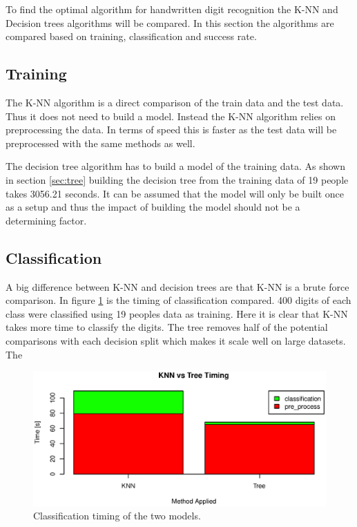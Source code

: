 To find the optimal algorithm for handwritten digit recognition the K-NN and Decision trees algorithms will be compared.
In this section the algorithms are compared based on training, classification and success rate.

\subsection{Training}
The K-NN algorithm is a direct comparison of the train data and the test data.
Thus it does not need to build a model.
Instead the K-NN algorithm relies on preprocessing the data.
In terms of speed this is faster as the test data will be preprocessed with the same methods as well.

The decision tree algorithm has to build a model of the training data. 
As shown in section \ref{sec:tree} building the decision tree from the training data of 19 people takes 3056.21 seconds.
It can be assumed that the model will only be built once as a setup and thus the impact of building the model should not be a determining factor.

\subsection{Classification}
A big difference between K-NN and decision trees are that K-NN is a brute force comparison.
In figure \ref{fig:algo_compare_timing} is the timing of classification compared.
400 digits of each class were classified using 19 peoples data as training.
Here it is clear that K-NN takes more time to classify the digits.
The tree removes half of the potential comparisons with each decision split which makes it scale well on large datasets.
The 

\begin{figure}[H]
\centering
\includegraphics[width=\textwidth]{graphics/algo_compare_timing}
\caption{Classification timing of the two models.}
\label{fig:algo_compare_timing}
\end{figure}

